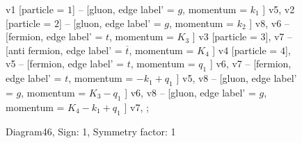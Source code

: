 \documentclass{revtex4}
\begin{document}
\begin{figure}[!htb]
\begin{center}
{    %
v1 [particle = \(1\)] -- [gluon, edge label' = \(g\), momentum = \(k_{1}\) ] v5, 
v2 [particle = \(2\)] -- [gluon, edge label' = \(g\), momentum = \(k_{2}\) ] v8, 
v6 -- [fermion, edge label' = \(t\), momentum = \(K_{3}\) ] v3 [particle = \(3\)], 
v7 -- [anti fermion, edge label' = \(\overline{t}\), momentum = \(K_{4}\) ] v4 [particle = \(4\)], 
v5 -- [fermion, edge label' = \(t\), momentum = \(q_{1}\) ] v6, 
v7 -- [fermion, edge label' = \(t\), momentum = \(-k_{1} + q_{1}\) ] v5, 
v8 -- [gluon, edge label' = \(g\), momentum = \(K_{3} - q_{1}\) ] v6, 
v8 -- [gluon, edge label' = \(g\), momentum = \(K_{4} - k_{1} + q_{1}\) ] v7, 
};
\end{center}
\caption{Diagram46, Sign: 1, Symmetry factor: 1}
\end{figure}
\newpage
\end{document}
